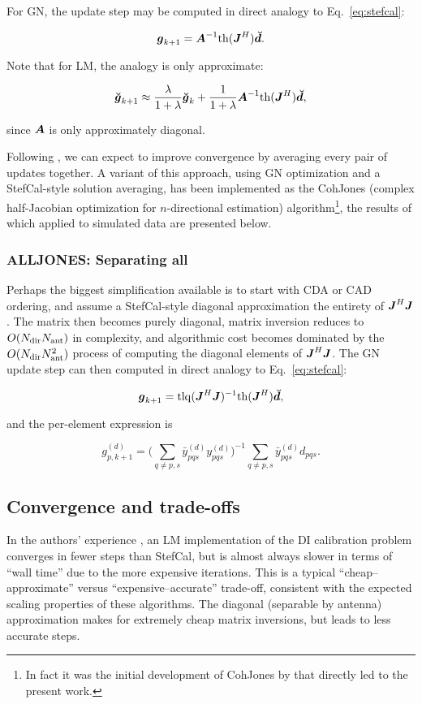 \documentclass[useAMS,usenatbib]{mn2e}
\newcommand{\mat}[1]{{\bmath{#1}}}
\newcommand{\JJ}{\mat{J}} %
\newcommand{\JHJ}{\JJ^H\JJ} %
\newcommand{\StefCal}{{\sc StefCal}}
\begin{document}
For GN, the update step may be computed in direct analogy to Eq.~\ref{eq:stefcal}:

\[
\bmath{g}_{k+1} = \bmath{A}^{-1} \TOP(\JJ^H) \Dd.
\]

Note that for LM, the analogy is only approximate:

\[
\Gg_{k+1} \approx \frac{\lambda}{1+\lambda}\Gg_k + \frac{1}{1+\lambda} \bmath{A}^{-1} \TOP(\JJ^H) \Dd,
\]

since $\bmath{A}$ is only approximately diagonal.

Following \citet{Stefcal}, we can expect to improve convergence by averaging every pair of updates together. 
A variant of this approach, using GN optimization and a \StefCal-style solution averaging, has been 
implemented as the {\sc CohJones} (complex half-Jacobian optimization for $n$-directional estimation) 
algorithm\footnote{In fact it was the initial development of {\sc CohJones} by \citet{tasse-cohjones} that directly led to the
present work.}, the results of which applied to simulated data are presented below.

\subsubsection{ALLJONES: Separating all}

Perhaps the biggest simplification available is to start with CDA or CAD ordering, and assume a \StefCal-style diagonal 
approximation the entirety of $\JHJ$. The matrix then becomes purely diagonal, matrix inversion reduces to $O(N_\mathrm{dir}N_\mathrm{ant})$ in 
complexity, and algorithmic cost becomes dominated by the $O(N_\mathrm{dir}N_\mathrm{ant}^2)$ process of computing the diagonal elements of 
$\JHJ$. The GN update step can then computed in direct analogy to Eq.~\ref{eq:stefcal}:

\[
\bmath{g}_{k+1} = \UL(\JHJ)^{-1} \TOP(\JJ^H) \Dd,
\]

and the per-element expression is 

\begin{equation}
\label{eq:stefcal:dd:unpol}
g_{p,k+1}^{(d)} = 
\big( \sum\limits_{q\ne p,s} \bar{y}^{(d)}_{pqs} y^{(d)}_{pqs} \big)^{-1}
\sum\limits_{q\ne p,s} \bar{y}^{(d)}_{pqs} d_{pqs}.
\end{equation}

\subsection{Convergence and trade-offs}

In the authors' experience \citep{OMS-Stefcal}, an LM implementation of the DI calibration problem converges in fewer steps 
than \StefCal, but is almost always slower in terms of ``wall time'' due to the more expensive iterations. This is a 
typical ``cheap--approximate'' versus ``expensive--accurate'' trade-off, consistent with the expected scaling properties 
of these algorithms. The diagonal (separable by antenna) approximation makes for extremely cheap matrix inversions,
but leads to less accurate steps.
\end{document}
